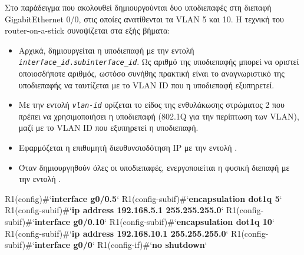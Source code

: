 \documentclass{EdipyLabs} %
\begin{document}
Στο παράδειγμα που ακολουθεί δημιουργούνται δυο υποδιεπαφές στη διεπαφή GigabitEthernet 0/0, στις οποίες ανατίθενται τα VLAN 5 και 10. Η τεχνική του router-on-a-stick συνοψίζεται στα εξής βήματα:\label{inter-vlan}
\begin{itemize}
	\item Αρχικά, δημιουργείται η υποδιεπαφή με την εντολή  \texttt{\textit{interface\_id}.\textit{subinterface\_id}}. Ως αριθμό της υποδιεπαφής μπορεί να οριστεί οποιοσδήποτε αριθμός, ωστόσο συνήθης πρακτική είναι το αναγνωριστικό της υποδιεπαφής να ταυτίζεται με το VLAN ID που η υποδιεπαφή εξυπηρετεί. 
	\item Με την εντολή  \texttt{\textit{vlan-id}} ορίζεται το είδος της ενθυλάκωσης στρώματος 2 που πρέπει να χρησιμοποιήσει η υποδιεπαφή (802.1Q για την περίπτωση των VLAN), μαζί με το VLAN ID που εξυπηρετεί η υποδιεπαφή. 
	\item Εφαρμόζεται η επιθυμητή διευθυνσιοδότηση IP με την εντολή . 
	\item Όταν δημιουργηθούν όλες οι υποδιεπαφές, ενεργοποιείται η φυσική διεπαφή με την εντολή . 
\end{itemize}

\begin{CommandBox}
R1(config)#`\textbf{interface g0/0.5}`
R1(config-subif)#`\textbf{encapsulation dot1q 5}`
R1(config-subif)#`\textbf{ip address 192.168.5.1 255.255.255.0}`
R1(config-subif)#`\textbf{interface g0/0.10}`
R1(config-subif)#`\textbf{encapsulation dot1q 10}`
R1(config-subif)#`\textbf{ip address 192.168.10.1 255.255.255.0}`
R1(config-subif)#`\textbf{interface g0/0}`
R1(config-if)#`\textbf{no shutdown}`
\end{CommandBox}

\newpage
\end{document}
